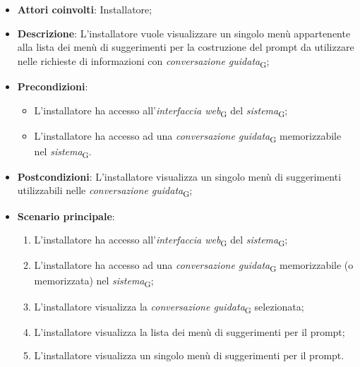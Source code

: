 \begin{itemize}
    \item \textbf{Attori coinvolti}: Installatore;
    \item \textbf{Descrizione}: L'installatore vuole visualizzare un singolo menù appartenente alla lista dei menù di suggerimenti per la costruzione del prompt da utilizzare nelle richieste di informazioni con \textit{conversazione guidata}\textsubscript{G};
    \item \textbf{Precondizioni}: 
    \begin{itemize}
        \item L’installatore ha accesso all’\textit{interfaccia web}\textsubscript{G} del \textit{sistema}\textsubscript{G};
        \item L’installatore ha accesso ad una \textit{conversazione guidata}\textsubscript{G} memorizzabile nel \textit{sistema}\textsubscript{G}.
    \end{itemize}
    \item \textbf{Postcondizioni}: L'installatore visualizza un singolo menù di suggerimenti utilizzabili nelle \textit{conversazione guidata}\textsubscript{G};
    \item \textbf{Scenario principale}:
    \begin{enumerate}
        \item L’installatore ha accesso all’\textit{interfaccia web}\textsubscript{G} del \textit{sistema}\textsubscript{G};
        \item L’installatore ha accesso ad una \textit{conversazione guidata}\textsubscript{G} memorizzabile (o memorizzata) nel \textit{sistema}\textsubscript{G};
        \item L'installatore visualizza la \textit{conversazione guidata}\textsubscript{G} selezionata;
        \item L'installatore visualizza la lista dei menù di suggerimenti per il prompt;
        \item L'installatore visualizza un singolo menù di suggerimenti per il prompt.
    \end{enumerate}
\end{itemize}

